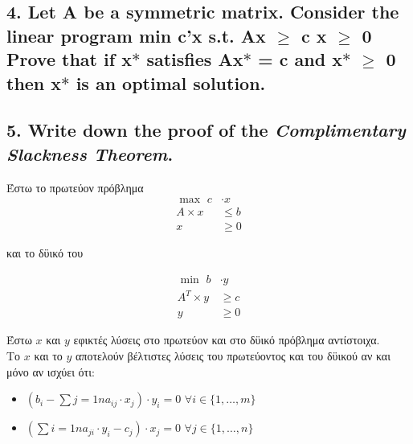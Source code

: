 \documentclass[12pt]{article}
\newcommand{\margin}{\hspace{4pt}}
\begin{document}
\vspace{2in}

\pagebreak

\subsection*{4. Let A be a symmetric matrix. Consider the linear program
min c'x
s.t. Ax \ensuremath{\geq} c
x \ensuremath{\geq} 0
Prove that if x\ensuremath{*} satisfies Ax\ensuremath{*} = c and x\ensuremath{*} \ensuremath{\geq} 0 then x\ensuremath{*} is an optimal solution.}

\vspace{2in}

\pagebreak

\subsection*{5. Write down the proof of the \textit{Complimentary Slackness Theorem}.}

Έστω το πρωτεύον πρόβλημα \\

\begin{align*}
    \max \margin c & \cdot x \\
    A \times x & \leq b \\
    x & \geq 0
\end{align*}

και το δϋικό του

\begin{align*}
    \min \margin b & \cdot y \\
    A^T \times y & \geq c \\
    y & \geq 0
\end{align*}

Έστω \( x \) και \( y \) εφικτές λύσεις στο πρωτεύον και στο δϋικό πρόβλημα αντίστοιχα. \\

Το \( x \) και το \( y \) αποτελούν βέλτιστες λύσεις του πρωτεύοντος και του δϋικού
αν και μόνο αν ισχύει ότι: \\

\begin{itemize}
    \item \( (b_i - \sum{j = 1}{n} a_{ij} \cdot x_j) \cdot y_i = 0 \margin \forall i \in \{ 1, \ldots, m\} \)
    \item \( (\sum{i = 1}{n} a_{ji} \cdot y_i - c_j) \cdot x_j = 0 \margin \forall j \in \{ 1, \ldots, n\} \)
\end{itemize}
\end{document}
